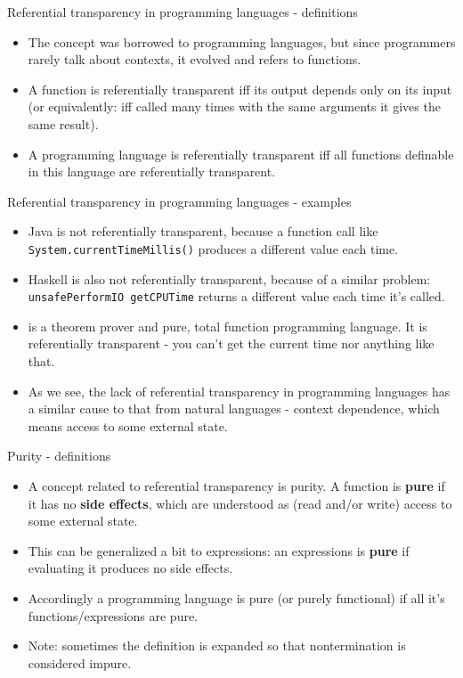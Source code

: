 \documentclass{beamer}
\newcommand{\link}[2]{\href{#2}{\color{blue}{#1}}}
\begin{document}
\begin{frame}{Referential transparency in programming languages - definitions}
\begin{itemize}
	\item The concept was borrowed to programming languages, but since programmers rarely talk about contexts, it evolved and refers to functions.
	\item A function is referentially transparent iff its output depends only on its input (or equivalently: iff called many times with the same arguments it gives the same result).
	\item A programming language is referentially transparent iff all functions definable in this language are referentially transparent.
\end{itemize}
\end{frame}

\begin{frame}{Referential transparency in programming languages - examples}
\begin{itemize}
	\item Java is not referentially transparent, because a function call like \texttt{System.currentTimeMillis()} produces a different value each time.
	\item Haskell is also not referentially transparent, because of a similar problem: \texttt{unsafePerformIO getCPUTime} returns a different value each time it's called.
	\item \link{Coq}{https://coq.inria.fr/} is a theorem prover and pure, total function programming language. It is referentially transparent - you can't get the current time nor anything like that.
	\item As we see, the lack of referential transparency in programming languages has a similar cause to that from natural languages - context dependence, which means access to some external state.
\end{itemize}
\end{frame}

\begin{frame}{Purity - definitions}
\begin{itemize}
	\item A concept related to referential transparency is purity. A function is \textbf{pure} if it has no \textbf{side effects}, which are understood as (read and/or write) access to some external state.
	\item This can be generalized a bit to expressions: an expressions is \textbf{pure} if evaluating it produces no side effects.
	\item Accordingly a programming language is pure (or purely functional) if all it's functions/expressions are pure.
	\item Note: sometimes the definition is expanded so that nontermination is considered impure.
\end{itemize}
\end{frame}
\end{document}
